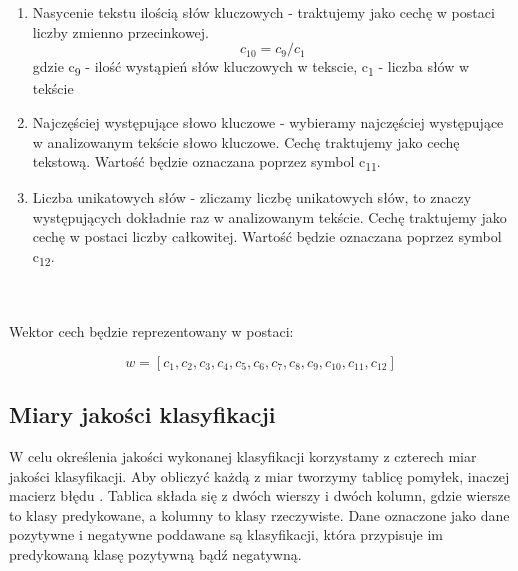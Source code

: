 \documentclass{classrep}
\begin{document}
\begin{enumerate}
  \item Nasycenie tekstu ilością słów kluczowych - traktujemy jako cechę w postaci liczby zmienno przecinkowej.  \begin{equation} c_{10} = c_9 / c_1 \end{equation}  gdzie c\textsubscript{9} - ilość wystąpień słów kluczowych w tekscie, c\textsubscript{1} - liczba słów w tekście\\
  \item Najczęściej występujące słowo kluczowe - wybieramy najczęściej występujące w analizowanym tekście słowo kluczowe. Cechę traktujemy jako cechę tekstową. Wartość będzie oznaczana poprzez symbol  c\textsubscript{11}.\\
  \item Liczba unikatowych słów - zliczamy liczbę unikatowych słów, to znaczy występujących dokładnie raz w analizowanym tekście. Cechę traktujemy jako cechę w postaci liczby całkowitej. Wartość będzie oznaczana poprzez symbol  c\textsubscript{12}.\\
\end{enumerate}

\ \\ \\
Wektor cech będzie reprezentowany w postaci: 

\begin{equation} w = [c_1, c_2, c_3, c_4, c_5, c_6, c_7, c_8, c_9, c_{10}, c_{11}, c_{12}] \end{equation}



\subsection{Miary jakości klasyfikacji} 
W celu określenia jakości wykonanej klasyfikacji korzystamy z czterech miar jakości klasyfikacji. Aby obliczyć każdą z miar tworzymy tablicę pomyłek, inaczej macierz błędu \cite{tablica}. Tablica składa się z dwóch wierszy i dwóch kolumn, gdzie wiersze to klasy predykowane, a kolumny to klasy rzeczywiste. Dane oznaczone jako dane pozytywne i negatywne poddawane są klasyfikacji, która przypisuje im predykowaną klasę pozytywną bądź negatywną.\\
\end{document}
